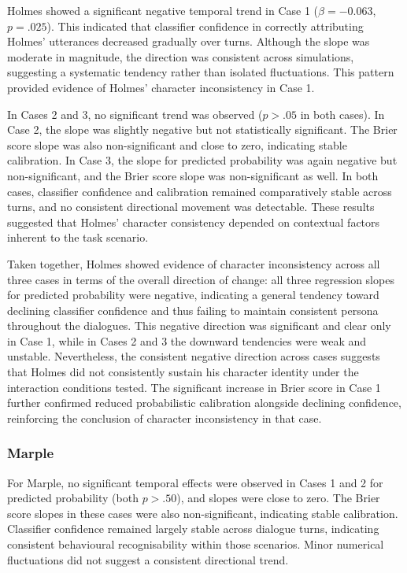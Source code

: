 \documentclass{article}
\begin{document}
Holmes showed a significant negative temporal trend in Case 1 ($\beta=-0.063$, $p=.025$). This indicated that classifier confidence in correctly attributing Holmes' utterances decreased gradually over turns. Although the slope was moderate in magnitude, the direction was consistent across simulations, suggesting a systematic tendency rather than isolated fluctuations. This pattern provided evidence of Holmes' character inconsistency in Case 1.

In Cases 2 and 3, no significant trend was observed ($p>.05$ in both cases). In Case 2, the slope was slightly negative but not statistically significant. The Brier score slope was also non-significant and close to zero, indicating stable calibration. In Case 3, the slope for predicted probability was again negative but non-significant, and the Brier score slope was non-significant as well. In both cases, classifier confidence and calibration remained comparatively stable across turns, and no consistent directional movement was detectable. These results suggested that Holmes' character consistency depended on contextual factors inherent to the task scenario.

Taken together, Holmes showed evidence of character inconsistency across all three cases in terms of the overall direction of change: all three regression slopes for predicted probability were negative, indicating a general tendency toward declining classifier confidence and thus failing to maintain consistent persona throughout the dialogues. This negative direction was significant and clear only in Case 1, while in Cases 2 and 3 the downward tendencies were weak and unstable. Nevertheless, the consistent negative direction across cases suggests that Holmes did not consistently sustain his character identity under the interaction conditions tested. The significant increase in Brier score in Case 1 further confirmed reduced probabilistic calibration alongside declining confidence, reinforcing the conclusion of character inconsistency in that case.

\subsubsection{Marple} \label{sec:results_classifier_marple}

For Marple, no significant temporal effects were observed in Cases 1 and 2 for predicted probability (both $p>.50$), and slopes were close to zero. The Brier score slopes in these cases were also non-significant, indicating stable calibration. Classifier confidence remained largely stable across dialogue turns, indicating consistent behavioural recognisability within those scenarios. Minor numerical fluctuations did not suggest a consistent directional trend.
\end{document}
